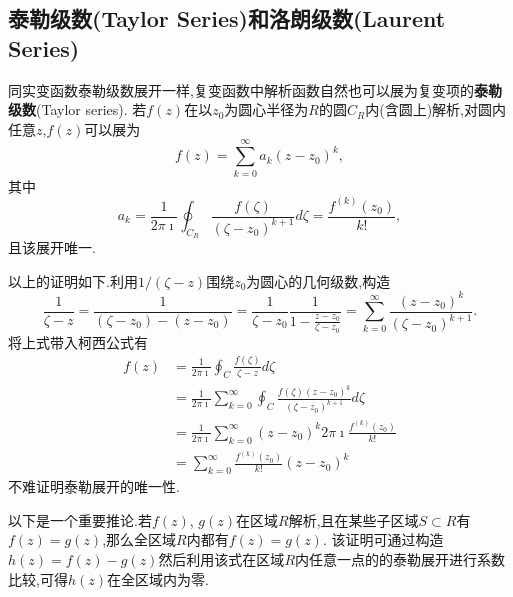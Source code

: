 \subsection{泰勒级数(Taylor Series)和洛朗级数(Laurent Series)}
\label{subsec:taylor_laurent_series}
同实变函数泰勒级数展开一样,复变函数中解析函数自然也可以展为复变项的\textbf{泰勒级数}(Taylor series).
若$f(z)$在以$z_0$为圆心半径为$R$的圆$C_R$内(含圆上)解析,对圆内任意$z$,$f(z)$可以展为
\begin{equation}
    f(z) = \sum_{k=0}^{\infty} a_k (z-z_0)^k,
\end{equation}
其中
\begin{equation}
    a_k=\frac{1}{2 \pi \imath} \oint_{C_{R}} \frac{f(\zeta)}{\left(\zeta-z_0\right)^{k+1}} d \zeta
    =\frac{f^{(k)}\left(z_0\right)}{k !} ,
\end{equation}
且该展开唯一.

以上的证明如下.利用$1/(\zeta -z)$围绕$z_0$为圆心的几何级数,构造
\[
\frac{1}{\zeta -z} = \frac{1}{(\zeta -z_0) - (z - z_0)} = \frac{1}{\zeta - z_0}\frac{1}{ 1 - \frac{z-z_0}{\zeta - z_0}}
 = \sum_{k=0}^{\infty}\frac{(z-z_0)^k}{(\zeta - z_0)^{k+1}}.    
\]
将上式带入柯西公式有
\begin{equation}
    \begin{aligned}
        f(z) &= \frac{1}{2\pi \imath} \oint_C \frac{f(\zeta)}{\zeta - z} d \zeta
        \\
        &= \frac{1}{2\pi \imath} \sum_{k=0} ^{\infty} \oint_C \frac{f(\zeta)(z-z_0)^k}{(\zeta - z_0)^{k+1}} d \zeta
        \\
        &= \frac{1}{2\pi \imath} \sum_{k=0} ^{\infty}(z-z_0)^k 2\pi \imath \frac{f^{(k)}(z_0)}{k!}
        \\
        & = \sum_{k=0} ^{\infty}  \frac{f^{(k)}(z_0)}{k!} (z-z_0)^k
    \end{aligned}
\end{equation}
不难证明泰勒展开的唯一性.

以下是一个重要推论.若$f(z)$, $g(z)$在区域$R$解析,且在某些子区域$S\subset R$有$f(z)=g(z)$,那么全区域$R$内都有$f(z)=g(z)$.
该证明可通过构造$h(z) = f(z) - g(z)$然后利用该式在区域$R$内任意一点的的泰勒展开进行系数比较,可得$h(z)$在全区域内为零.

